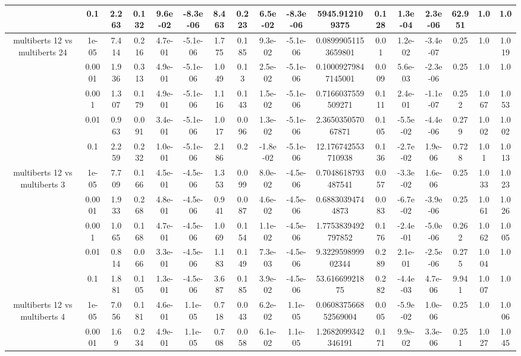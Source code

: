 \begin{tabular}{|c|c|c|c|c|c|c|c|c|c|c|c|c|c|c|c|c|}
 & 0.1 & 2.263 & 0.132 & 9.6e-02 & -8.3e-06 & 8.463 & 0.223 & 6.5e-02 & -8.3e-06 & 5945.912109375 & 0.128 & 1.3e-04 & 2.3e-06 & 62.951 & 1.0 & 1.0 \\
\hline
\multirow{5}{*}{multiberts 12 vs multiberts 24} & 1e-05 & 7.414 & 0.216 & 4.7e-01 & -5.1e-06 & 1.775 & 0.185 & 9.3e-02 & -5.1e-06 & 0.08999051153659801 & 0.01 & 1.2e-02 & -3.4e-07 & 0.25 & 1.0 & 1.019 \\
 & 0.0001 & 1.936 & 0.313 & 4.9e-01 & -5.1e-06 & 1.049 & 0.13 & 2.5e-02 & -5.1e-06 & 0.10009279847145001 & 0.009 & 5.6e-03 & -2.3e-06 & 0.25 & 1.0 & 1.0 \\
 & 0.001 & 1.307 & 0.179 & 4.9e-01 & -5.1e-06 & 1.116 & 0.143 & 1.5e-02 & -5.1e-06 & 0.7166037559509271 & 0.111 & 2.4e-01 & -1.1e-07 & 0.252 & 1.067 & 1.053 \\
 & 0.01 & 0.963 & 0.091 & 3.4e-01 & -5.1e-06 & 1.017 & 0.096 & 1.3e-02 & -5.1e-06 & 2.365035057067871 & 0.105 & -5.5e-02 & -4.4e-06 & 0.279 & 1.002 & 1.002 \\
 & 0.1 & 2.259 & 0.232 & 1.0e-01 & -5.1e-06 & 2.186 & 0.2 & -1.8e-02 & -5.1e-06 & 12.176742553710938 & 0.136 & -2.7e-02 & 1.9e-06 & 0.728 & 1.01 & 1.013 \\
\hline
\multirow{5}{*}{multiberts 12 vs multiberts 3} & 1e-05 & 7.709 & 0.166 & 4.5e-01 & -4.5e-06 & 1.353 & 0.099 & 8.0e-02 & -4.5e-06 & 0.7048618793487541 & 0.057 & -3.3e-02 & 1.6e-06 & 0.25 & 1.033 & 1.023 \\
 & 0.0001 & 1.933 & 0.268 & 4.8e-01 & -4.5e-06 & 0.941 & 0.087 & 4.6e-02 & -4.5e-06 & 0.68830394744873 & 0.083 & -6.7e-02 & -3.9e-06 & 0.25 & 1.061 & 1.026 \\
 & 0.001 & 1.065 & 0.168 & 4.7e-01 & -4.5e-06 & 1.069 & 0.154 & 1.1e-02 & -4.5e-06 & 1.7753839492797852 & 0.176 & -2.4e-01 & -5.0e-06 & 0.262 & 1.062 & 1.005 \\
 & 0.01 & 0.814 & 0.066 & 3.3e-01 & -4.5e-06 & 1.183 & 0.149 & 7.3e-03 & -4.5e-06 & 9.322959899902344 & 0.289 & 2.1e-01 & -2.5e-06 & 0.275 & 1.004 & 1.0 \\
 & 0.1 & 1.881 & 0.105 & 1.3e-01 & -4.5e-06 & 3.687 & 0.185 & 3.9e-02 & -4.5e-06 & 53.61669921875 & 0.282 & -4.4e-03 & 4.7e-06 & 9.941 & 1.007 & 1.0 \\
\hline
\multirow{5}{*}{multiberts 12 vs multiberts 4} & 1e-05 & 7.056 & 0.181 & 4.6e-01 & 1.1e-05 & 0.718 & 0.043 & 6.2e-02 & 1.1e-05 & 0.060837566852569004 & 0.005 & -5.9e-02 & 1.0e-06 & 0.25 & 1.0 & 1.006 \\
 & 0.0001 & 1.69 & 0.234 & 4.9e-01 & 1.1e-05 & 0.708 & 0.058 & 6.1e-02 & 1.1e-05 & 1.2682099342346191 & 0.171 & 9.9e-02 & 3.3e-06 & 0.251 & 1.027 & 1.045 \\

\end{tabular}
